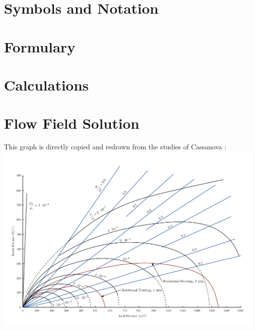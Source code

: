 \appendix

\section*{Symbols and Notation}

\newpage

\section*{Formulary}

\newpage

\listoffigures

\listoftables
\newpage

\printbibliography
\newpage

\section{Calculations}


\section{Flow Field Solution}
\label{apx:flow-field}
This graph is directly copied and redrawn from the studies of Cassanova \cite{Cassanova1965}:\\
\includegraphics[angle=90, width=\textwidth]{src/03_analytical-work/fig_velocity-distribution.pdf}
